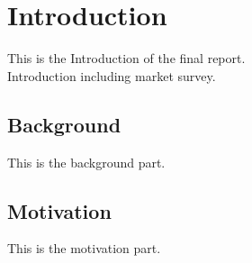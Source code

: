 \section{Introduction} 
This is the Introduction of the final report.\cite{Benner} \\
Introduction including market survey.
\subsection{Background}
This is the background part.
\subsection{Motivation}
This is the motivation part.

\newpage